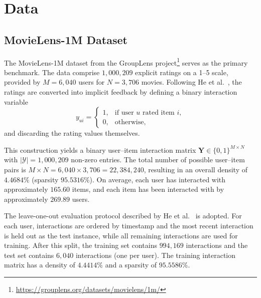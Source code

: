 \documentclass[11pt]{article}
\begin{document}
\section{Data}

\subsection{MovieLens-1M Dataset}

The MovieLens-1M dataset from the GroupLens project\footnote{\url{https://grouplens.org/datasets/movielens/1m/}} 
serves as the primary benchmark. The data comprise $1{,}000{,}209$ explicit ratings on a 1--5 scale, provided by 
$M = 6{,}040$ users for $N = 3{,}706$ movies. Following He et al.~\cite{he2017neural}, the ratings are converted 
into implicit feedback by defining a binary interaction variable
\[
    y_{ui} =
    \begin{cases}
        1, & \text{if user } u \text{ rated item } i,\\
        0, & \text{otherwise},
    \end{cases}
\]
and discarding the rating values themselves.

This construction yields a binary user--item interaction matrix 
$\mathbf{Y} \in \{0,1\}^{M \times N}$ with $|\mathcal{Y}| = 1{,}000{,}209$ non-zero entries.  
The total number of possible user--item pairs is $M \times N = 6{,}040 \times 3{,}706 = 22{,}384{,}240$, resulting in 
an overall density of $4.4684\%$ (sparsity $95.5316\%$). On average, each user has interacted with approximately 
$165.60$ items, and each item has been interacted with by approximately $269.89$ users.

The leave-one-out evaluation protocol described by He et al.~\cite{he2017neural} is adopted. For each user, 
interactions are ordered by timestamp and the most recent interaction is held out as the test instance, while all 
remaining interactions are used for training. After this split, the training set contains $994{,}169$ interactions and 
the test set contains $6{,}040$ interactions (one per user). The training interaction matrix has a density of $4.4414\%$ 
and a sparsity of $95.5586\%$.
\end{document}

